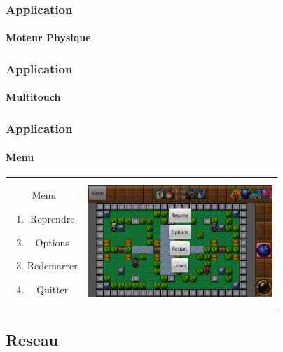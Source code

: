 	\begin{frame}
	\frametitle{Application}
	\framesubtitle{Moteur Physique}
	
	\end{frame}
	
	\begin{frame}
	\frametitle{Application}
	\framesubtitle{Multitouch}
	
	\end{frame}
	
	\begin{frame}
	\frametitle{Application}
	\framesubtitle{Menu}
	
			\begin{tabular}{cc}
			\begin{minipage}{4cm}
				Menu
				\begin{enumerate}
					\item Reprendre
					\item Options
					\item Redemarrer
					\item Quitter
				\end{enumerate}
			\end{minipage} &
			\begin{minipage}{7cm}
				\includegraphics[width=7cm]{img/menusolo.png} 
			\end{minipage}\\
		\end{tabular}
	
	\end{frame}


\subsection{Reseau}